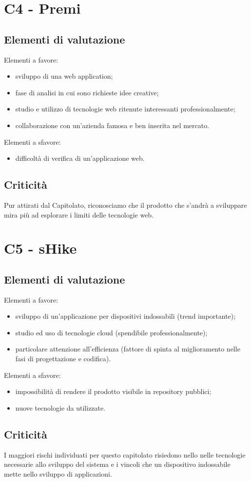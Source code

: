 \section{C4 - Premi}{
	\subsection{Elementi di valutazione}{
		Elementi a favore:
		\begin{itemize}
			\item sviluppo di una web application;
			\item fase di analisi in cui sono richieste idee creative;
			\item studio e utilizzo di tecnologie web ritenute interessanti professionalmente;
			\item collaborazione con un'azienda famosa e ben inserita nel mercato.
		\end{itemize}
		
		Elementi a sfavore:
		\begin{itemize}
			\item difficoltà di verifica di un'applicazione web.
		\end{itemize}
	}
	\subsection{Criticità}{
		Pur attirati dal Capitolato, riconosciamo che il prodotto che s'andrà a sviluppare mira più ad esplorare i limiti delle tecnologie web.
	}
}
\section{C5 - sHike}{
	\subsection{Elementi di valutazione}{
		Elementi a favore:
		\begin{itemize}
			\item sviluppo di un'applicazione per dispositivi indossabili (trend importante);
			\item studio ed uso di tecnologie cloud (spendibile professionalmente);
			\item particolare attenzione all'efficienza (fattore di spinta al miglioramento nelle fasi di progettazione e codifica).
		\end{itemize}
		
		Elementi a sfavore:
		\begin{itemize}
			\item impossibilità di rendere il prodotto visibile in repository pubblici;
			\item nuove tecnologie da utilizzate.
		\end{itemize}
	}
	\subsection{Criticità}{
		I maggiori rischi individuati per questo capitolato risiedono nello nelle tecnologie necessarie allo sviluppo del sistema e i vincoli che un dispositivo indossabile mette nello sviluppo di applicazioni. 
	}
}